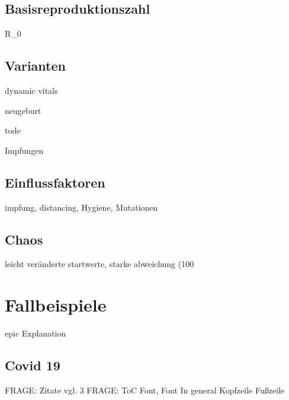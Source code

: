 \documentclass[12pt]{scrartcl} %
\begin{document}

\subsection{Basisreproduktionszahl}

R_{0}


\subsection{Varianten}

dynamic vitals

\textnu neugeburt

\textmu tode

\textrho Impfungen


\subsection{Einflussfaktoren}

impfung, distancing, Hygiene, Mutationen


\subsection{Chaos}

leicht veränderte startwerte, starke abweichung (100%


\newpage
\section{Fallbeispiele}

epic Explanation


\subsection{Covid 19}

FRAGE: Zitate vgl. 3
FRAGE: ToC Font, Font In general
Kopfzeile Fußzeile
\end{document}
